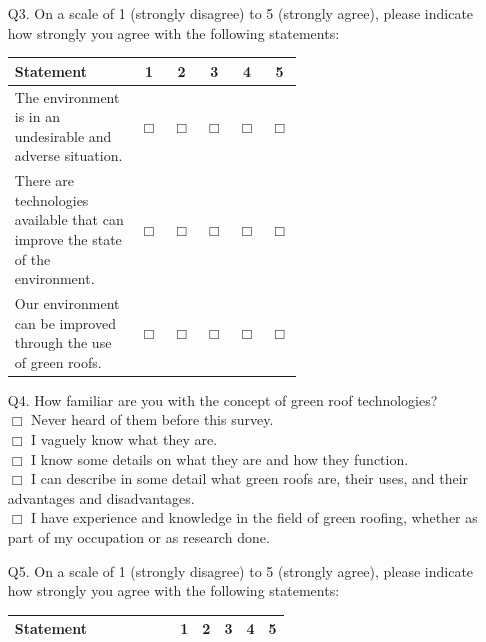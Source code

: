 \documentclass[a4paper]{article}
\begin{document}
\begin{appendices}
\begin{itemize}
    \item[Q3.] On a scale of 1 (strongly disagree) to 5 (strongly agree),
      please indicate how strongly you agree with the following statements:
      \begin{table}[H]
        \begin{tabular}{|p{0.6\linewidth}|c|c|c|c|c|}
          \hline
          Statement & 1 & 2 & 3 & 4 &
          5 \\ \hline

          The environment is in an undesirable and adverse situation. &
          $\Box$ & $\Box$ & $\Box$ & $\Box$ & $\Box$ \\ \hline

          There are technologies available that can improve the state of
          the environment. & $\Box$ & $\Box$ & $\Box$ & $\Box$ & $\Box$
          \\ \hline

          Our environment can be improved through the use of green roofs. &
          $\Box$ & $\Box$ & $\Box$ & $\Box$ & $\Box$ \\ \hline
        \end{tabular}
      \end{table}

    \item[Q4.] How familiar are you with the concept of green roof
      technologies? \\ $\Box$ Never heard of them before this survey. \\
      $\Box$ I vaguely know what they are. \\ $\Box$ I know some details on
      what they are and how they function. \\ $\Box$ I can describe in some
      detail what green roofs are,  their uses, and their advantages and
      disadvantages. \\ $\Box$ I have experience and knowledge in the field
      of green roofing, whether as part of my occupation or as research done.

    \item[Q5.] On a scale of 1 (strongly disagree) to 5 (strongly agree),
      please indicate how strongly you agree with the following statements:
      \begin{table}[H]
        \begin{tabular}{|p{0.6\linewidth}|c|c|c|c|c|}
          \hline
          Statement & 1 & 2 & 3 & 4 &
          5 \\ \hline


\end{tabular}
\end{table}
\end{itemize}
\end{appendices}
\end{document}
